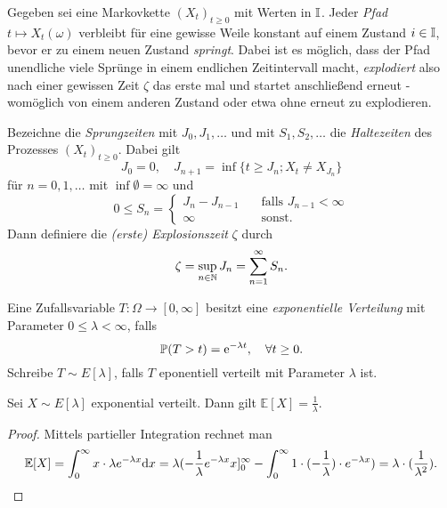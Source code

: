 \documentclass[a4paper]{paper}
\numberwithin{equation}{satz}
\begin{document}
\begin{bem} Gegeben sei eine Markovkette $(X_t)_{t\geq0}$ mit Werten in $\I$. Jeder \textit{Pfad} $t\mapsto X_t(\omega)$ verbleibt für eine gewisse Weile konstant auf einem Zustand $i\in\I$, bevor er zu einem neuen Zustand \textit{springt}. Dabei ist es möglich, dass der Pfad unendliche viele Sprünge in einem endlichen Zeitintervall macht, \textit{explodiert} also nach einer gewissen Zeit $\zeta$ das erste mal und startet anschließend erneut - womöglich von einem anderen Zustand oder etwa ohne erneut zu explodieren.
  
\par Bezeichne die \textit{Sprungzeiten} mit $J_0,J_1,\dots$ und mit $S_1,S_2,\dots$ die \textit{Haltezeiten} des Prozesses $(X_t)_{t\geq0}$. Dabei gilt $$J_0=0,\quad J_{n+1}=\inf\{t\geq J_n; X_t\neq X_{J_n}\}$$ für $n=0,1,\dots$ mit $\inf\emptyset = \infty$ und $$0\leq S_n=\begin{cases}J_n- J_{n-1}\quad&\text{falls } J_{n-1}< \infty\\\infty\quad&\text{sonst.}\end{cases}$$Dann definiere die \textit{(erste) Explosionszeit} $\zeta$ durch $$\zeta = \sup_{n\in\N}J_n=\sum_{n=1}^\infty S_n.$$ 

\end{bem}

\begin{defi}
  Eine Zufallsvariable $T\colon\Omega\to[0,\infty]$ besitzt eine \textit{exponentielle Verteilung} mit Parameter $0\leq \lambda <\infty$, falls $$\P(T>t)=\text e^{-\lambda t},\quad\forall t\geq0.$$ Schreibe $T\sim E[\lambda]$, falls $T$ eponentiell verteilt mit Parameter $\lambda$ ist. 
\end{defi}

\begin{bem}
Sei $X\sim E[\lambda]$ exponential verteilt. Dann gilt $\mathbb E[X]=\frac{1}{\lambda}$.
\end{bem}

\begin{proof}
Mittels partieller Integration rechnet man $$\mathbb E[X]=\int_0^\infty x\cdot \lambda e^{-\lambda x}\text dx = \lambda(-\frac{1}{\lambda}e^{-\lambda x}x]_0^\infty -\int_0^\infty 1\cdot(-\frac{1}{\lambda})\cdot e^{-\lambda x})=\lambda\cdot(\frac{1}{\lambda ^2}).$$
\end{proof}

\begin{comment}
\begin{konstr}[Poissonprozess]
  Ein \textit{Poissonprozess mit Intensität $\lambda$} ist ein rechtsseitig stetiger Prozess $(X_t)_{t\geq0}$ mit Werten in $\N_0$ so, dass die Haltezeiten $S_1,S_2,\dots$ unabhängige und exponentialverteilte Zufallsvariablen mit Parameter $\lambda$ sind und die Sprungkette ist gegeben durch $Y_n=n$ für alle $n\geq 0$.
\end{konstr}
\end{comment}
\end{document}
